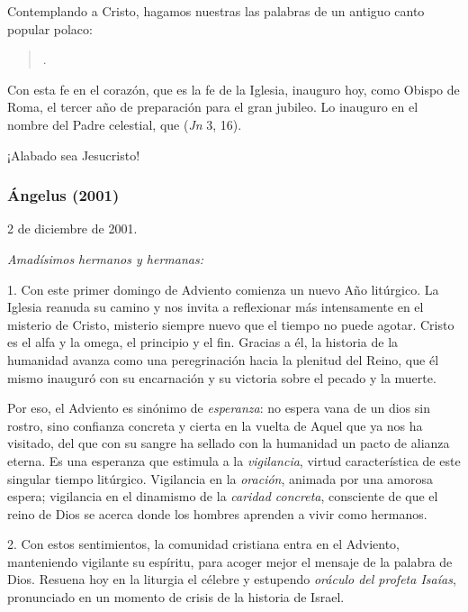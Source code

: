 Contemplando a Cristo, hagamos nuestras las palabras de un antiguo canto popular polaco:

\begin{quote} . \end{quote}

Con esta fe en el corazón, que es la fe de la Iglesia, inauguro hoy, como Obispo de Roma, el tercer año de preparación para el gran jubileo. Lo inauguro en el nombre del Padre celestial, que  (\emph{Jn} 3, 16).

¡Alabado sea Jesucristo!

\subsubsection{Ángelus (2001)} 

2 de diciembre de 2001.



\emph{Amadísimos hermanos y hermanas:}

1. Con este primer domingo de Adviento comienza un nuevo Año litúrgico. La Iglesia reanuda su camino y nos invita a reflexionar más intensamente en el misterio de Cristo, misterio siempre nuevo que el tiempo no puede agotar. Cristo es el alfa y la omega, el principio y el fin. Gracias a él, la historia de la humanidad avanza como una peregrinación hacia la plenitud del Reino, que él mismo inauguró con su encarnación y su victoria sobre el pecado y la muerte.

Por eso, el Adviento es sinónimo de \emph{esperanza}: no espera vana de un dios sin rostro, sino confianza concreta y cierta en la vuelta de Aquel que ya nos ha visitado, del  que con su sangre ha sellado con la humanidad un pacto de alianza eterna. Es una esperanza que estimula a la \emph{vigilancia}, virtud característica de este singular tiempo litúrgico. Vigilancia en la \emph{oración}, animada por una amorosa espera; vigilancia en el dinamismo de la \emph{caridad concreta}, consciente de que el reino de Dios se acerca donde los hombres aprenden a vivir como hermanos.

2. Con estos sentimientos, la comunidad cristiana entra en el Adviento, manteniendo vigilante su espíritu, para acoger mejor el mensaje de la palabra de Dios. Resuena hoy en la liturgia el célebre y estupendo \emph{oráculo del profeta Isaías}, pronunciado en un momento de crisis de la historia de Israel.

